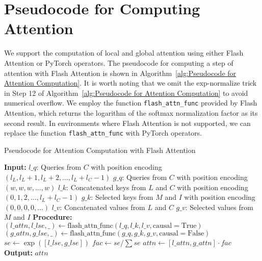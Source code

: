 \section{Pseudocode for Computing Attention}
\label{sec:pseudocode_attn}
We support the computation of local and global attention using either Flash Attention \citep{dao2205fast} or PyTorch operators. The pseudocode for computing a step of attention with Flash Attention is shown in Algorithm~\ref{alg:Pseudocode for Attention Computation}. It is worth noting that we omit the exp-normalize trick in Step 12 of Algorithm~\ref{alg:Pseudocode for Attention Computation} to avoid numerical overflow. We employ the function \texttt{flash\_attn\_func} provided by Flash Attention, which returns the logarithm of the softmax normalization factor as its second result. In environments where Flash Attention is not supported, we can replace the function \texttt{flash\_attn\_func} with PyTorch operators.
\begin{algorithm*} 
\caption{Pseudocode for Attention Computation with Flash Attention}
\begin{algorithmic}[1]
\State \textbf{Input:}
\State $l\_q$: Queries from $C$ with position encoding $(l_L, l_L+1, l_L+2, \ldots, l_L + l_C - 1)$
\State $g\_q$: Queries from $C$ with position encoding $(w, w, w, \ldots, w)$
\State $l\_k$: Concatenated keys from $L$ and $C$ with position encoding $(0, 1, 2, \ldots, l_L + l_C - 1)$
\State $g\_k$: Selected keys from $M$ and $I$ with position encoding $(0, 0, 0, 0, \ldots)$
\State $l\_v$: Concatenated values from $L$ and $C$
\State $g\_v$: Selected values from $M$ and $I$
\State
\State \textbf{Procedure:}
\State $(l\_attn, l\_lse, \_) \leftarrow \text{flash\_attn\_func}(l\_q, l\_k, l\_v, \mathrm{causal}=\mathrm{True})$
\State $(g\_attn, g\_lse, \_) \leftarrow \text{flash\_attn\_func}(g\_q, g\_k, g\_v, \mathrm{causal}=\mathrm{False})$
\State $se \leftarrow \exp([l\_lse, g\_lse])$
\State $fac \leftarrow se / \sum se$
\State $attn \leftarrow [l\_attn, g\_attn] \cdot fac$
\State
\State \textbf{Output:}
\State $attn$
\end{algorithmic}
\label{alg:Pseudocode for Attention Computation}
\end{algorithm*}


% 